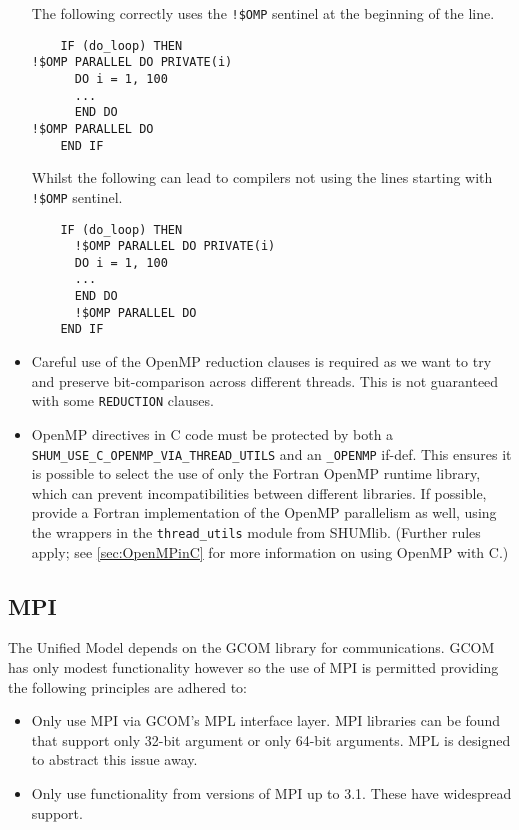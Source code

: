 \begin{itemize}
The following correctly uses the \verb|!$OMP| sentinel at the beginning of the line.
\begin{verbatim}
    IF (do_loop) THEN
!$OMP PARALLEL DO PRIVATE(i)
      DO i = 1, 100
      ...
      END DO
!$OMP PARALLEL DO
    END IF
\end{verbatim}

Whilst the following can lead to compilers not using the lines starting with \verb|!$OMP| sentinel. \nopagebreak[4]
\begin{verbatim}
    IF (do_loop) THEN
      !$OMP PARALLEL DO PRIVATE(i)
      DO i = 1, 100
      ...
      END DO
      !$OMP PARALLEL DO
    END IF
\end{verbatim}
\item Careful use of the OpenMP reduction clauses is required as
we want to try and preserve bit-comparison across different threads.  This is not guaranteed with some \verb|REDUCTION| clauses.

\item OpenMP directives in C code must be protected by both a \verb|SHUM_USE_C_OPENMP_VIA_THREAD_UTILS| and an \verb|_OPENMP| if-def.
This ensures it is possible to select the use of only the Fortran OpenMP runtime library, which can prevent incompatibilities between different libraries.
If possible, provide a Fortran implementation of the OpenMP parallelism as well, using the wrappers in the \verb|thread_utils| module from SHUMlib.
(Further rules apply; see \ref{sec:OpenMPinC} for more information on using OpenMP with C.)

\end{itemize}


\subsection{MPI}\label{sec:mpi}
The Unified Model depends on the GCOM library for communications. GCOM has
only modest functionality however so the use of MPI is permitted providing
the following principles are adhered to:

\begin{itemize}
\item Only use MPI via GCOM's MPL interface layer. MPI libraries can be
found that support only 32-bit argument or only 64-bit arguments. MPL is
designed to abstract this issue away.
\item Only use functionality from versions of MPI up to 3.1. These have
widespread support.
\end{itemize}


